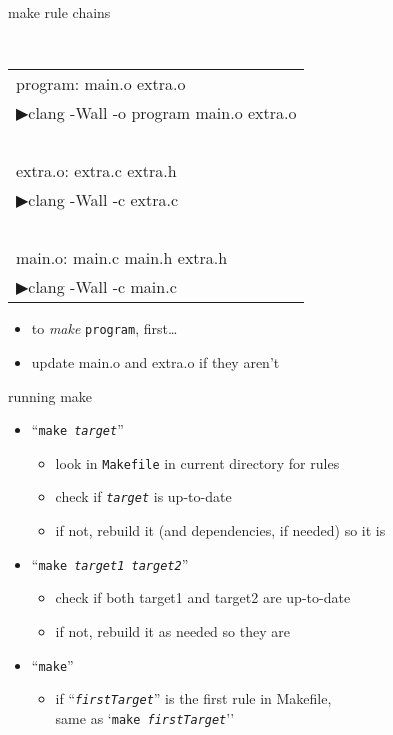 \begin{frame}{make rule chains}

{\tt
\begin{tabular}{l}
program: main.o extra.o \\
▶\hspace{3cm}clang -Wall -o program main.o extra.o \\
~ \\
extra.o: extra.c extra.h \\
▶\hspace{3cm}clang -Wall -c extra.c \\
~ \\
main.o: main.c main.h extra.h \\
▶\hspace{3cm}clang -Wall -c main.c \\
\end{tabular}
}
\begin{itemize}
\item to \textit{make} \texttt{program}, first\ldots
\item update main.o and extra.o if they aren't
\end{itemize}
\end{frame}

\begin{frame}{running make}
\begin{itemize}
    \item ``\texttt{make \textit{target}}''
        \begin{itemize}
        \item look in \texttt{Makefile} in current directory for rules
        \item check if \texttt{\textit{target}} is up-to-date
        \item if not, rebuild it (and dependencies, if needed) so it is
        \end{itemize}
    \item ``\texttt{make \textit{target1} \textit{target2}}''
        \begin{itemize}
        \item check if both target1 and target2 are up-to-date
        \item if not, rebuild it as needed so they are
        \end{itemize}
    \item ``\texttt{make}''
        \begin{itemize}
        \item if ``\texttt{\textit{firstTarget}}'' is the first rule in Makefile,\\
            same as `\texttt{make \textit{firstTarget}}''
        \end{itemize}
\end{itemize}
\end{frame}
